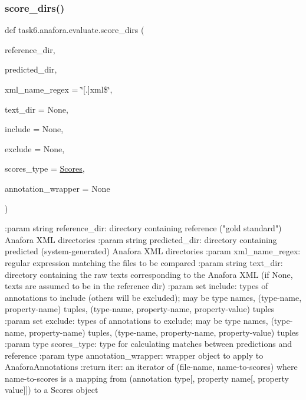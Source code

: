 \subsubsection{\texorpdfstring{score\+\_\+dirs()}{score\_dirs()}}
{\footnotesize\ttfamily def task6.\+anafora.\+evaluate.\+score\+\_\+dirs (\begin{DoxyParamCaption}\item[{}]{reference\+\_\+dir,  }\item[{}]{predicted\+\_\+dir,  }\item[{}]{xml\+\_\+name\+\_\+regex = {\ttfamily \char`\"{}\mbox{[}.\mbox{]}xml\$\char`\"{}},  }\item[{}]{text\+\_\+dir = {\ttfamily None},  }\item[{}]{include = {\ttfamily None},  }\item[{}]{exclude = {\ttfamily None},  }\item[{}]{scores\+\_\+type = {\ttfamily \hyperlink{classtask6_1_1anafora_1_1evaluate_1_1Scores}{Scores}},  }\item[{}]{annotation\+\_\+wrapper = {\ttfamily None} }\end{DoxyParamCaption})}

\begin{DoxyVerb}:param string reference_dir: directory containing reference ("gold standard") Anafora XML directories
:param string predicted_dir: directory containing predicted (system-generated) Anafora XML directories
:param xml_name_regex: regular expression matching the files to be compared
:param string text_dir: directory containing the raw texts corresponding to the Anafora XML
    (if None, texts are assumed to be in the reference dir)
:param set include: types of annotations to include (others will be excluded); may be type names,
    (type-name, property-name) tuples, (type-name, property-name, property-value) tuples
:param set exclude: types of annotations to exclude; may be type names, (type-name, property-name) tuples,
    (type-name, property-name, property-value) tuples
:param type scores_type: type for calculating matches between predictions and reference
:param type annotation_wrapper: wrapper object to apply to AnaforaAnnotations
:return iter: an iterator of (file-name, name-to-scores) where name-to-scores is a mapping from
    (annotation type[, property name[, property value]]) to a Scores object
\end{DoxyVerb}
 \mbox{\label{namespacetask6_1_1anafora_1_1evaluate_aad7a5a4b937cb2a4a31b4ce68b1b517e}} 
